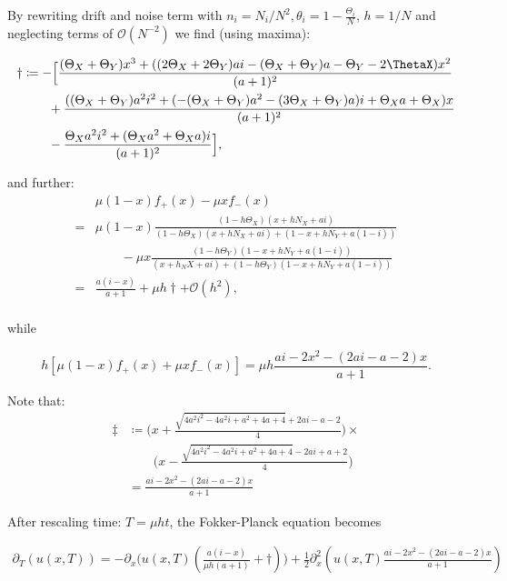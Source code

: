 By rewriting drift and noise term with $n_i = N_i/N^2, \theta_i = 1- \frac{\Theta_i}{N}$, $h = 1/N$ and neglecting terms of $\mathcal{O}(N^{-2})$ we find (using maxima):

\begin{align*}
	\dagger &\coloneqq -\Big[\frac{(\Theta_X + \Theta_Y)x^3 + ((2\Theta_X + 2\Theta_Y)ai -(\Theta_X + \Theta_Y)a - \Theta_Y - 2\ThetaX)x^2}{(a+1)^2}\Big.\\
	&\qquad + \Big.\frac{((\Theta_X + \Theta_Y)a^2 i^2 + (- (\Theta_X + \Theta_Y)a^2 -(3\Theta_X + \Theta_Y)a)i + \Theta_X a + \Theta_X)x}{(a+1)^2}\Big.\\
	&\qquad - \Big.\frac{\Theta_X a^2 i^2 + (\Theta_X a^2 + \Theta_X a)i}{(a+1)^2}\Big],
\end{align*}

and further: 
\begin{align*}
	& \mu(1-x)f_+(x) - \mu xf_-(x)\\
	= & \mu(1-x) \frac{(1-h\Theta_X) (x+ hN_X+ ai)}{(1-h\Theta_X) (x + hN_X + ai) + (1-x + hN_Y + a(1-i))}\\
	&\qquad - \mu x \frac{(1-h\Theta_Y)(1-x+hN_Y+a(1-i))}{(x+h_NX+ai) + (1-h\Theta_Y)(1-x+hN_Y+a(1-i))}\\
	=& \frac{a(i-x)}{a+1} + \mu h \dagger + \mathcal{O}(h^2),\\
\end{align*}

while 

\begin{equation*}
h\left[\mu(1-x)f_+(x) + \mu xf_-(x)\right] = \mu h \frac{ai - 2x^2 - (2ai - a -2)x}{a+1}.
\end{equation*}

Note that:
\begin{align*}
	\ddagger &\coloneqq \Big(x+\frac{\sqrt{4a^2i^2-4a^2i+a^2+4a+4}+2ai-a-2}{4}\Big) \times\\
	&\qquad \Big(x-\frac{\sqrt{4a^2i^2-4a^2i+a^2+4a+4}-2ai+a+2}{4}\Big)\\
	&=\frac{ai - 2x^2 - (2ai - a -2)x}{a+1}
\end{align*}


After rescaling time: $T = \mu h t$, the Fokker-Planck equation becomes

\begin{align*}
	\partial_T \left(u\left(x, T\right)\right) = -\partial_x\big(u(x,T)\left(\frac{a(i-x)}{\mu h(a+1)} + \dagger \right)\big) + \frac{1}{2} \partial^2_x\left(u(x,T)\frac{ai - 2x^2 - (2ai - a -2)x}{a+1}\right)
\end{align*}

